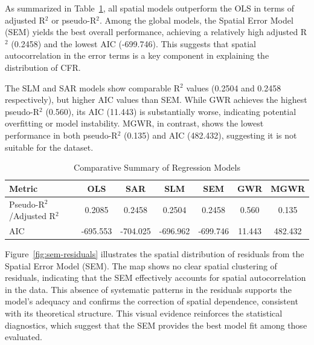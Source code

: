 \documentclass[a4paper,fleqn]{cas-sc}
\begin{document}
As summarized in Table~\ref{tab:spatial_models}, all spatial models outperform the OLS in terms of adjusted R$^2$ or pseudo-R$^2$. Among the global models, the Spatial Error Model (SEM) yields the best overall performance, achieving a relatively high adjusted R$^2$ (0.2458) and the lowest AIC (-699.746). This suggests that spatial autocorrelation in the error terms is a key component in explaining the distribution of CFR.

The SLM and SAR models show comparable R$^2$ values (0.2504 and 0.2458 respectively), but higher AIC values than SEM. While GWR achieves the highest pseudo-R$^2$ (0.560), its AIC (11.443) is substantially worse, indicating potential overfitting or model instability.  MGWR, in contrast, shows the lowest performance in both pseudo-R$^2$ (0.135) and AIC (482.432), suggesting it is not suitable for the dataset.
\begin{table}[htbp]
  \centering
  \caption{Comparative Summary of Regression Models}
  \label{tab:spatial_models}
  \begin{tabular}{@{}lcccccc@{}}
  \toprule
  \textbf{Metric} & \textbf{OLS} & \textbf{SAR} & \textbf{SLM} & \textbf{SEM} & \textbf{GWR} & \textbf{MGWR}\\
  \midrule
  Pseudo-R$^2$/Adjusted R$^2$   & 0.2085   & 0.2458 & 0.2504  & 0.2458  & 0.560 & 0.135 \\
  AIC   & -695.553  & -704.025 & -696.962 & -699.746 & 11.443 & 482.432 \\
  \bottomrule
  \end{tabular}
  \end{table}

  Figure~\ref{fig:sem-residuals} illustrates the spatial distribution of residuals from the Spatial Error Model (SEM). The map shows no clear spatial clustering of residuals, indicating that the SEM effectively accounts for spatial autocorrelation in the data. This absence of systematic patterns in the residuals supports the model's adequacy and confirms the correction of spatial dependence, consistent with its theoretical structure. This visual evidence reinforces the statistical diagnostics, which suggest that the SEM provides the best model fit among those evaluated. 
\end{document}
